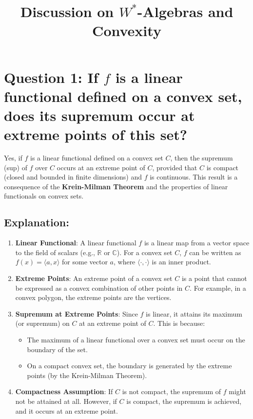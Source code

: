 \documentclass{article}
\title{Discussion on \( W^* \)-Algebras and Convexity}
\author{}
\date{}
\begin{document}
\maketitle

\section*{Question 1: If \( f \) is a linear functional defined on a convex set, does its supremum occur at extreme points of this set?}

Yes, if \( f \) is a linear functional defined on a convex set \( C \), then the supremum (sup) of \( f \) over \( C \) occurs at an extreme point of \( C \), provided that \( C \) is compact (closed and bounded in finite dimensions) and \( f \) is continuous. This result is a consequence of the \textbf{Krein-Milman Theorem} and the properties of linear functionals on convex sets.

\subsection*{Explanation:}
\begin{enumerate}
    \item \textbf{Linear Functional}: A linear functional \( f \) is a linear map from a vector space to the field of scalars (e.g., \( \mathbb{R} \) or \( \mathbb{C} \)). For a convex set \( C \), \( f \) can be written as \( f(x) = \langle a, x \rangle \) for some vector \( a \), where \( \langle \cdot, \cdot \rangle \) is an inner product.

    \item \textbf{Extreme Points}: An extreme point of a convex set \( C \) is a point that cannot be expressed as a convex combination of other points in \( C \). For example, in a convex polygon, the extreme points are the vertices.

    \item \textbf{Supremum at Extreme Points}: Since \( f \) is linear, it attains its maximum (or supremum) on \( C \) at an extreme point of \( C \). This is because:
    \begin{itemize}
        \item The maximum of a linear functional over a convex set must occur on the boundary of the set.
        \item On a compact convex set, the boundary is generated by the extreme points (by the Krein-Milman Theorem).
    \end{itemize}

    \item \textbf{Compactness Assumption}: If \( C \) is not compact, the supremum of \( f \) might not be attained at all. However, if \( C \) is compact, the supremum is achieved, and it occurs at an extreme point.
\end{enumerate}
\end{document}
